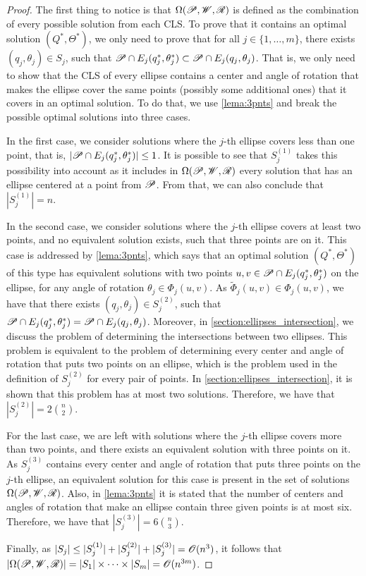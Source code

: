 \begin{proof}
	The first thing to notice is that $\Omega(\mathscr{P}, \mathscr{W}, \mathscr{R})$ is defined as the combination of every possible solution from each CLS. To prove that it contains an optimal solution $(Q^*, \Theta^*)$, we only need to prove that for all $j\in\{1, \dots, m\}$, there exists $(q_j, \theta_j)\in S_j$, such that $\mathscr{P} \cap E_j(q_j^*, \theta_j^*) \subset \mathscr{P} \cap E_j(q_j, \theta_j)$. That is, we only need to show that the CLS of every ellipse contains a center and angle of rotation that makes the ellipse cover the same points (possibly some additional ones) that it covers in an optimal solution. To do that, we use \autoref{lema:3pnts} and break the possible optimal solutions into three cases.
	
	 In the first case, we consider solutions where the $j$-th ellipse covers less than one point, that is, $|\mathscr{P} \cap E_j(q_j^*, \theta_j^*)|\le1$. It is possible to see that $S_j^{(1)}$ takes this possibility into account as it includes in $\Omega(\mathscr{P}, \mathscr{W}, \mathscr{R})$ every solution that has an ellipse centered at a point from $\mathscr{P}$. From that, we can also conclude that $|S_j^{(1)}| = n$.
	
	In the second case, we consider solutions where the $j$-th ellipse covers at least two points, and no equivalent solution exists, such that three points are on it. This case is addressed by \autoref{lema:3pnts}, which says that an optimal solution $(Q^*, \Theta^*)$ of this type has equivalent solutions with two points $u, v \in \mathscr{P} \cap E_j(q_j^*, \theta_j^*)$ on the ellipse, for any angle of rotation $\theta_j \in \Phi_j(u, v)$.
	As $\tilde{\Phi}_j(u,v) \in \Phi_j(u,v)$, we have that there exists $(q_j, \theta_j) \in S_j^{(2)}$, such that $\mathscr{P} \cap E_j(q_j^*, \theta_j^*) = \mathscr{P} \cap E_j(q_j, \theta_j)$. 
	Moreover, in \autoref{section:ellipses_intersection}, we discuss the problem of determining the intersections between two ellipses. This problem is equivalent to the problem of determining every center and angle of rotation that puts two points on an ellipse, which is the problem used in the definition of $S_j^{(2)}$ for every pair of points. In \autoref{section:ellipses_intersection}, it is shown that this problem has at most two solutions. Therefore, we have that $|S_j^{(2)}| = 2\binom{n}{2}$.
	
	For the last case, we are left with solutions where the $j$-th ellipse covers more than two points, and there exists an equivalent solution with three points on it. 
	As $S_j^{(3)}$ contains every center and angle of rotation that puts three points on the $j$-th ellipse, an equivalent solution for this case is present in the set of solutions $\Omega(\mathscr{P}, \mathscr{W}, \mathscr{R})$. Also, in \autoref{lema:3pnts} it is stated that the number of centers and angles of rotation that make an ellipse contain three given points is at most six. Therefore, we have that $|S_j^{(3)}| = 6\binom{n}{3}$.
	
	Finally, as $|S_j| \le |S_j^{(1)}| +  |S_j^{(2)}| +  |S_j^{(3)}| = \mathscr{O}(n^{3})$, it follows that $|\Omega(\mathscr{P}, \mathscr{W}, \mathscr{R})| = |S_1|\times \dots \times |S_m| = \mathscr{O}(n^{3m})$.
\end{proof}


